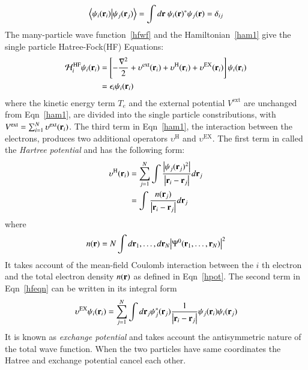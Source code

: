 \begin{equation}\label{norm1}
\braket{\psi_i(\vb{r}_i)}{\psi_j(\vb{r}_j)} = \int d\vb{r}\ \psi_i(\vb{r})^{\ast} \psi_j(\vb{r}) = \delta_{ij}
\end{equation}
The many-particle wave function~\eqref{hfwf} and the Hamiltonian~\eqref{ham1} give the single particle Hatree-Fock\footnotemark (HF) Equations:
\begin{align}\label{hfeqn}
\begin{split}
\mathcal{H}_i^{\text{HF}} \psi_i(\vb{r}_i) & = \left[-\frac{\nabla^2}{2} + \upsilon^{\text{ext}}(\vb{r}_i) + \upsilon^{\text{H}}(\vb{r}_i) + \upsilon^{\text{EX}}(\vb{r}_i) \right] \psi_i(\vb{r}_i) \\
		& = \epsilon_i\psi_i(\vb{r}_i)
\end{split}
\end{align}
where the kinetic energy term $T_e$ and the external potential $V^{\text{ext}}$ are unchanged from Eqn~\eqref{ham1}, are divided into the single particle constributions, with $V^{\text{ext}} = \sum^N_{i=1}\upsilon^{\text{ext}}(\vb{r}_i)$. The third term in Eqn~\eqref{ham1}, the interaction between the electrons, produces two additional operators $\upsilon^{\text{H}}$ and $\upsilon^{\text{EX}}$. The first term in called the \textit{Hartree potential} and has the following form:
\begin{align}\label{hpot}
\begin{split}
	\upsilon^{\text{H}}(\vb{r}_i) & = \sum_{j=1}^N \int\frac{\abs{\psi_j(\vb{r}_j)^2}}{\abs{\vb{r}_i - \vb{r}_j}} d\vb{r}_j \\
     & = \int \frac{n(\vb{r}_j)}{\abs{\vb{r}_i - \vb{r}_j}} d\vb{r}_j
\end{split}
\end{align}
where
\begin{equation}\label{density}
    n(\vb{r}) = N \int d\vb{r}_1,\dots,d\vb{r}_N \abs{\Psi^0(\vb{r}_1,\dots,\vb{r}_N)}^2
\end{equation}
It takes account of the mean-field Coulomb interaction between the $i$ th electron and the total electron density $n(\vb{r})$ as defined in Eqn~\eqref{hpot}. The second term in Eqn~\eqref{hfeqn} can be written in its integral form
\begin{equation}\label{exeqn}
\upsilon^{\text{EX}}\psi_i(\vb{r}_i) = \sum_{j=1}^N \int d\vb{r}_j\psi^{\ast}_j(\vb{r}_j)\frac{1}{\abs{\vb{r}_i - \vb{r}_j}}\psi_j(\vb{r}_i)\psi_i(\vb{r}_j)
\end{equation}
It is known as \textit{exchange potential} and takes account the antisymmetric nature of the total wave function. When the two particles have same coordinates the Hatree and exchange potential cancel each other.

